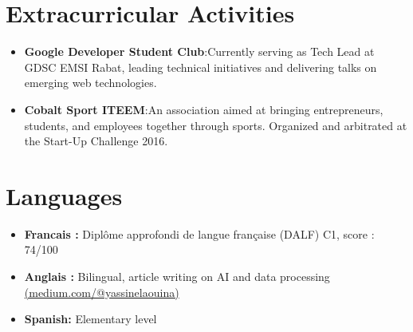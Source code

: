 \documentclass[a4paper,11pt]{article}
\newcommand{\resumeItem}[2]{
  \item{
    \textbf{#1}{:\hspace{0.5mm}#2 \vspace{-0.5mm}}
  }
}
\newcommand{\resumeSubItem}[2]{\resumeItem{#1}{#2}\vspace{-4pt}}
\newcommand{\resumeHeadingSkillStart}{\begin{itemize}[leftmargin=*,itemsep=1.7mm, rightmargin=2ex]}
\newcommand{\resumeItemListStart}{\begin{justify}\begin{itemize}[leftmargin=3ex, rightmargin=2ex, noitemsep,labelsep=1.2mm,itemsep=0mm]\small}
\newcommand{\resumeHeadingSkillEnd}{\end{itemize}\vspace{-2mm}}
\newcommand{\resumeItemListEnd}{\end{itemize}\end{justify}\vspace{-2mm}}
\begin{document}
\section{\textbf{Extracurricular Activities}}
\resumeHeadingSkillStart
 \resumeSubItem{Google Developer Student Club} 
    {Currently serving as Tech Lead at GDSC EMSI Rabat, leading technical initiatives and delivering talks on emerging web technologies.}
    
 \resumeSubItem{Cobalt Sport ITEEM}
 {An association aimed at bringing entrepreneurs, students, and employees together through sports. Organized and arbitrated at the Start-Up Challenge 2016.}


\resumeHeadingSkillEnd
\vspace{-3mm}

\section{\textbf{Languages}}
    \resumeItemListStart
        \item {{\textbf{ Francais :}}}
        {Diplôme approfondi de langue française (DALF) C1, score : 74/100 } 
        \item {{\textbf{ Anglais : }}}
        {Bilingual, article writing on AI and data processing \href{https://medium.com/@yassinelaouina}{(medium.com/@yassinelaouina)}} 
        \item {{\textbf{ Spanish:}}}
        {Elementary level} 
    \resumeItemListEnd
\vspace{-4mm}
\end{document}
